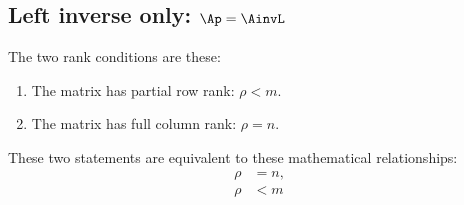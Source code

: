 \subsection{Left inverse only: $\Ap = \AinvL$}
The two rank conditions are these:
\begin{enumerate}
\item The matrix has partial row rank: $\rho < m$.
\item The matrix has full column rank: $\rho = n$.
\end{enumerate}
These two statements are equivalent to these mathematical relationships:
\begin{equation}
  \begin{split}
     \rho &= n, \\
     \rho &< m
  \end{split}
\end{equation}

